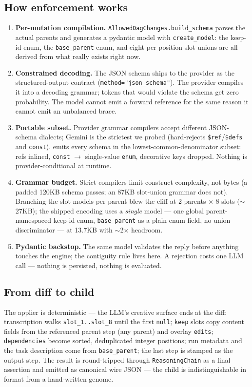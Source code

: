 \documentclass[11pt]{article}
\begin{document}
\subsection{How enforcement works}
\begin{enumerate}
  \item \textbf{Per-mutation compilation.} \texttt{AllowedDagChanges.build\_schema} parses
  the actual parents and generates a pydantic model with \texttt{create\_model}: the keep-id
  enum, the \texttt{base\_parent} enum, and eight per-position slot unions are all derived
  from what really exists right now.
  \item \textbf{Constrained decoding.} The JSON schema ships to the provider as the
  structured-output contract (\texttt{method="json\_schema"}). The provider compiles it into
  a decoding grammar; tokens that would violate the schema get zero probability. The model
  cannot emit a forward reference for the same reason it cannot emit an unbalanced brace.
  \item \textbf{Portable subset.} Provider grammar compilers accept different JSON-schema
  dialects; Gemini is the strictest we probed (hard-rejects \texttt{\$ref}/\texttt{\$defs}
  and \texttt{const}).  emits every schema in the
  lowest-common-denominator subset: refs inlined, \texttt{const} $\to$ single-value
  \texttt{enum}, decorative keys dropped. Nothing is provider-conditional at runtime.
  \item \textbf{Grammar budget.} Strict compilers limit construct complexity, not bytes (a
  padded 120KB schema passes; an 87KB slot-union grammar does not). Branching the slot
  models per parent blew the cliff at 2 parents $\times$ 8 slots ($\sim$27KB); the shipped
  encoding uses a \emph{single} model --- one global parent-namespaced keep-id enum,
  \texttt{base\_parent} as a plain enum field, no union discriminator --- at 13.7KB with
  $\sim$2$\times$ headroom.
  \item \textbf{Pydantic backstop.} The same model validates the reply before anything
  touches the engine; the contiguity rule lives here. A rejection costs one LLM call ---
  nothing is persisted, nothing is evaluated.
\end{enumerate}

\subsection{From diff to child}
The applier is deterministic --- the LLM's creative surface ends at the diff:
transcription walks \texttt{slot\_1..slot\_8} until the first \texttt{null}; \texttt{keep}
slots copy content fields from the referenced parent step (any parent) and overlay
\texttt{edits}; \texttt{dependencies} become sorted, deduplicated integer positions; run
metadata and the task description come from \texttt{base\_parent}; the last step is stamped
as the output step. The result is round-tripped through \texttt{ReasoningChain} as a final
assertion and emitted as canonical wire JSON --- the child is indistinguishable in format
from a hand-written genome.
\end{document}
